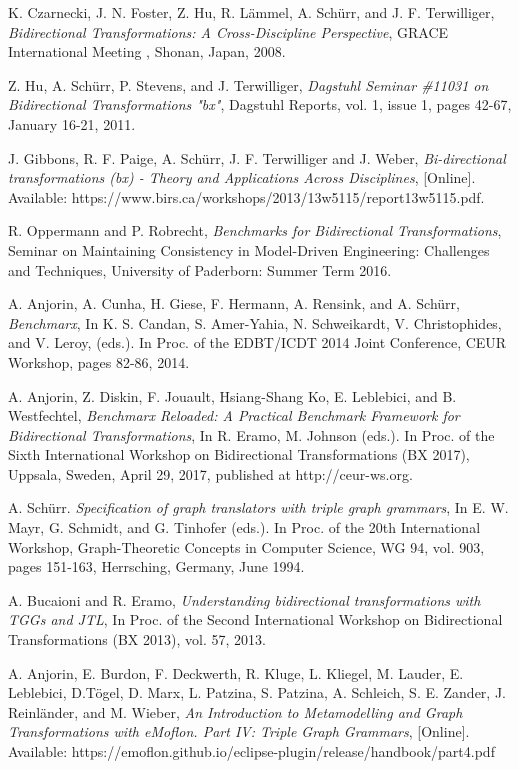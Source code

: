 \begin{thebibliography}{1}
	
	 K. Czarnecki, J. N. Foster, Z. Hu, R. L\"ammel, A. Sch\"urr, and J. F. Terwilliger,  {\em Bidirectional Transformations: A Cross-Discipline Perspective}, GRACE International Meeting , Shonan, Japan, 2008.
	
	 Z. Hu, A. Sch\"urr, P. Stevens, and J. Terwilliger, {\em Dagstuhl Seminar \#11031 on Bidirectional Transformations "bx"}, Dagstuhl Reports, vol. 1, issue 1, pages 42-67, January 16-21, 2011.
	
	 J. Gibbons, R. F. Paige, A. Sch\"urr, J. F. Terwilliger and J. Weber, {\em Bi-directional transformations (bx) - Theory and Applications Across Disciplines}, [Online]. Available:  https://www.birs.ca/workshops/2013/13w5115/report13w5115.pdf.
	
	 R. Oppermann and P. Robrecht, {\em Benchmarks for Bidirectional Transformations}, Seminar on Maintaining Consistency in Model-Driven Engineering: Challenges and Techniques, University of Paderborn: Summer Term 2016.
	
	 A. Anjorin, A. Cunha, H. Giese, F. Hermann, A. Rensink, and A. Sch\"urr, {\em Benchmarx}, In K. S. Candan, S. Amer-Yahia, N. Schweikardt, V. Christophides, and V. Leroy, (eds.). In Proc. of the EDBT/ICDT 2014 Joint Conference, CEUR Workshop, pages 82-86, 2014.
		
	 A. Anjorin, Z. Diskin, F. Jouault, Hsiang-Shang Ko, E. Leblebici, and B. Westfechtel, {\em Benchmarx Reloaded: A Practical Benchmark Framework for Bidirectional Transformations}, In R. Eramo, M. Johnson (eds.). In Proc. of the Sixth International Workshop on Bidirectional Transformations (BX 2017),
	Uppsala, Sweden, April 29, 2017, published at http://ceur-ws.org.
	
	 A. Sch\"urr. {\em Specification of graph translators with triple graph grammars}, In E. W. Mayr, G. Schmidt, and G. Tinhofer (eds.). In Proc. of the 20th International Workshop, Graph-Theoretic Concepts in Computer Science, WG 94, vol. 903, pages 151-163, Herrsching, Germany, June 1994.
	
	 A. Bucaioni and R. Eramo, {\em Understanding bidirectional transformations with TGGs and JTL}, In Proc. of the Second International Workshop on Bidirectional Transformations (BX 2013), vol. 57, 2013.
	
	 A. Anjorin, E. Burdon, F. Deckwerth, R. Kluge, L. Kliegel, M. Lauder, E. Leblebici, D.T\"ogel, D. Marx, L. Patzina, S. Patzina, A. Schleich, S. E. Zander, J. Reinl\"ander, and M. Wieber, {\em An Introduction to Metamodelling and Graph Transformations with eMoflon. Part IV: Triple Graph Grammars}, [Online]. Available: 
	https://emoflon.github.io/eclipse-plugin/release/handbook/part4.pdf
	

\end{thebibliography}
